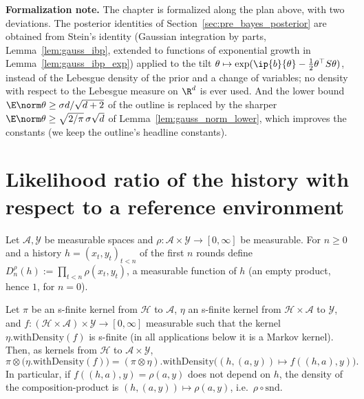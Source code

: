 \textbf{Formalization note.} The chapter is formalized along the plan above, with two
deviations. The posterior identities of Section~\ref{sec:pre_bayes_posterior} are obtained
from Stein's identity (Gaussian integration by parts, Lemma~\ref{lem:gauss_ibp}, extended to
functions of exponential growth in Lemma~\ref{lem:gauss_ibp_exp}) applied to the tilt
$\theta \mapsto \exp(\ip{b}{\theta} - \tfrac12\theta^\top S\theta)$, instead of the Lebesgue
density of the prior and a change of variables; no density with respect to the Lebesgue
measure on $\R^d$ is ever used. And the lower bound $\E\norm\theta \ge \sigma d/\sqrt{d+2}$ of
the outline is replaced by the sharper $\E\norm\theta \ge \sqrt{2/\pi}\,\sigma\sqrt d$ of
Lemma~\ref{lem:gauss_norm_lower}, which improves the constants (we keep the outline's
headline constants).

\section{Likelihood ratio of the history with respect to a reference environment}
\label{sec:pre_bayes_lr}

\begin{definition}\label{def:pb_env_density}
\leanok
Let $\mathcal{A},\mathcal{Y}$ be measurable spaces and $\rho : \mathcal{A}\times\mathcal{Y}\to[0,\infty]$
be measurable. For $n\ge0$ and a history $h = (x_t,y_t)_{t< n}$ of the first $n$ rounds define
$D_n^\rho(h) := \prod_{t<n}\rho(x_t,y_t)$, a measurable function of $h$ (an empty product,
hence $1$, for $n = 0$).
\end{definition}

\begin{lemma}
\label{lem:pb_kernel_compProd_withDensity_right}
\leanok
Let $\pi$ be an s-finite kernel from $\mathcal{H}$ to $\mathcal{A}$, $\eta$ an s-finite kernel
from $\mathcal{H}\times\mathcal{A}$ to $\mathcal{Y}$, and
$f : (\mathcal{H}\times\mathcal{A})\times\mathcal{Y}\to[0,\infty]$ measurable such that the
kernel $\eta.\mathrm{withDensity}(f)$ is s-finite (in all applications below it is a Markov
kernel). Then, as kernels from $\mathcal{H}$ to $\mathcal{A}\times\mathcal{Y}$,
\[
  \pi\otimes\big(\eta.\mathrm{withDensity}(f)\big)
  = (\pi\otimes\eta).\mathrm{withDensity}\big((h,(a,y))\mapsto f((h,a),y)\big).
\]
In particular, if $f((h,a),y) = \rho(a,y)$ does not depend on $h$, the density of the
composition-product is $(h,(a,y))\mapsto\rho(a,y)$, i.e.\ $\rho\circ\mathrm{snd}$.
\end{lemma}

